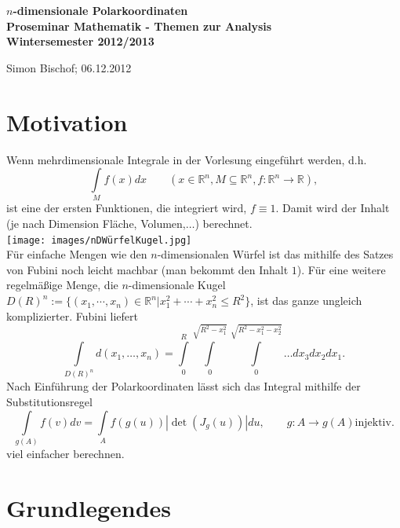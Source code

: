 \documentclass[a4paper,11pt]{scrartcl}
\newcommand{\R}{{\ensuremath{\mathbb{R}}}}
\newcommand{\const}{\ensuremath{\equiv}}
\begin{document}
\begin{titlepage}
	\begin{center}	
		\LARGE \textbf{$n$-dimensionale Polarkoordinaten \\[5ex]
			{\Large Proseminar Mathematik - Themen zur Analysis \\[5ex] 
    		Wintersemester 2012/2013}\\[5ex]}
	\end{center}
	\begin{center}
		Simon Bischof; 06.12.2012
	\end{center}
\end{titlepage}
\clearpage{}
\setcounter{tocdepth}{1}

\clearpage{}
\section{Motivation}
Wenn mehrdimensionale Integrale in der Vorlesung eingeführt werden, d.h.
\begin{equation}
\label{int}
\int\limits_M f(x)dx \qquad (x\in\R^n,M\subseteq \R^n, f:\R^n\to\R),\end{equation}
ist eine der ersten Funktionen, die integriert wird, $f\const 1$. Damit wird der Inhalt (je nach Dimension Fläche, Volumen,$\ldots$) berechnet.\\
\texttt{[image: images/nDWürfelKugel.jpg]}\\
Für einfache Mengen wie den $n$-dimensionalen Würfel ist das mithilfe des Satzes von Fubini noch leicht machbar (man bekommt den Inhalt $1$). Für eine weitere regelmäßige Menge, die $n$-dimensionale Kugel $D(R)^n:=\{(x_1,\cdots,x_n)\in\R^n|x_1^2+\cdots+x_n^2\leq R^2\}$, ist das ganze ungleich komplizierter. Fubini liefert
$$\int\limits_{D(R)^n} d(x_1,\ldots,x_n)= \int\limits_0^R\int\limits_0^{\sqrt{R^2-x_1^2}}\int\limits_0^{\sqrt{R^2-x_1^2-x_2^2}}\ldots dx_3 dx_2 dx_1.$$
Nach Einführung der Polarkoordinaten lässt sich das Integral mithilfe der Substitutionsregel
\begin{equation}
\label{subst}
\int\limits_{g(A)}f(v)dv=\int\limits_A f(g(u))|\det(J_g(u))| du, \qquad g:A\to g(A) \text{injektiv.}
\end{equation}
viel einfacher berechnen.
\section{Grundlegendes}
\end{document}
